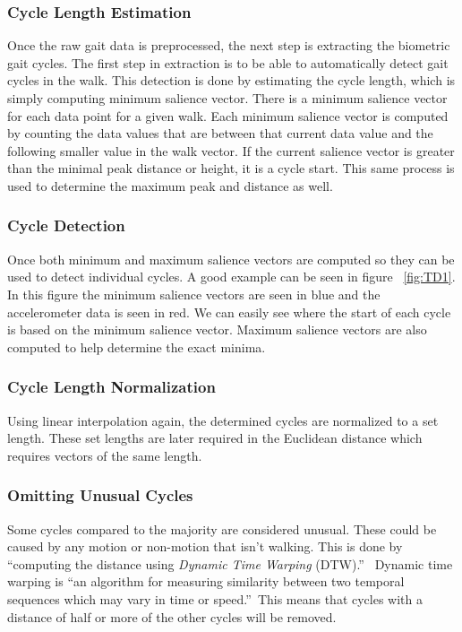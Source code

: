 \documentclass{sig-alternate}
\begin{document}
\subsubsection{Cycle Length Estimation}
Once the raw gait data is preprocessed, the next step is extracting the biometric gait cycles. The first step in extraction is to be able to automatically detect gait cycles in the walk. This detection is done by estimating the cycle length, which is simply computing minimum salience vector. There is a minimum salience vector for each data point for a given walk. Each minimum salience vector is computed by counting the data values that are between that current data value and the following smaller value in the walk vector. If the current salience vector is greater than the minimal peak distance or height, it is a cycle start. This same process is used to determine the maximum peak and distance as well.
\subsubsection{Cycle Detection}
Once both minimum and maximum salience vectors are computed so they can be used to detect individual cycles. A good example can be seen in figure ~\ref{fig:TD1}. In this figure the minimum salience vectors are seen in blue and the accelerometer data is seen in red. We can easily see where the start of each cycle is based on the minimum salience vector. Maximum salience vectors are also computed to help determine the exact minima.
\subsubsection{Cycle Length Normalization}
Using linear interpolation again, the determined cycles are normalized to a set length. These set lengths are later required in the Euclidean distance which requires vectors of the same length.
\subsubsection{Omitting Unusual Cycles}
Some cycles compared to the majority are considered unusual. These could be caused by any motion or non-motion that isn't walking. This is done by ``computing the distance using \textit{Dynamic Time Warping} (DTW).''~\cite{Muaaz:2013} Dynamic time warping is ``an algorithm for measuring similarity between two temporal sequences which may vary in time or speed.''~\cite{wiki2:2014}This means that cycles with a distance of half or more of the other cycles will be removed.
\end{document}
